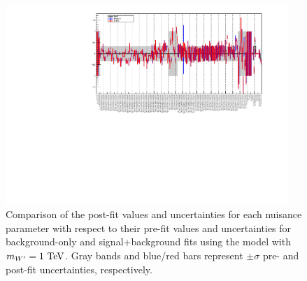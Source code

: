 \begin{figure}[htbp]
  \centering
  \includegraphics[width=0.95\textwidth,angle=270]{fig/fitValidation/nuisances_WprToWH1000.pdf}
  \caption{
    Comparison of the post-fit values and uncertainties for each nuisance parameter with respect to their pre-fit values and uncertainties for background-only and signal+background fits using the \DY\WprtoWH model with $m_{\Wpr}=1\unit{TeV}$.
    Gray bands and blue/red bars represent $\pm\sigma$ pre- and post-fit uncertainties, respectively.
  }
  \label{fig:nuisances}
\end{figure}

